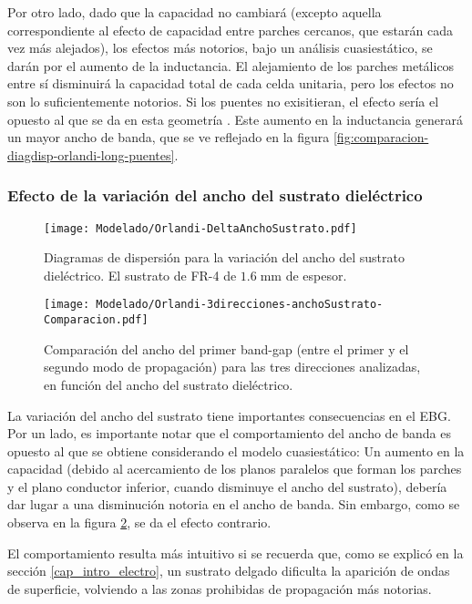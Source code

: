 Por otro lado, dado que la capacidad no cambiará (excepto aquella correspondiente al efecto de capacidad entre parches cercanos, que estarán cada vez más alejados), los efectos más notorios, bajo un análisis cuasiestático, se darán por el aumento de la inductancia. El alejamiento de los parches metálicos entre sí disminuirá la capacidad total de cada celda unitaria, pero los efectos no son lo suficientemente notorios. Si los puentes no exisitieran, el efecto sería el opuesto al que se da en esta geometría \cite{Yang:EBGAntennas}. Este aumento en la inductancia generará un mayor ancho de banda, que se ve reflejado en la figura \ref{fig:comparacion-diagdisp-orlandi-long-puentes}.

\subsubsection{Efecto de la variación del ancho del sustrato dieléctrico}

\begin{figure}[h]
	\centering
	\texttt{[image: Modelado/Orlandi-DeltaAnchoSustrato.pdf]}
	\caption{Diagramas de dispersión para la variación del ancho del sustrato dieléctrico. El sustrato de FR-4 de $1.6\;\text{mm}$ de espesor.}
	\label{fig:diagdisp-orlandi-variacion-ancho-diel}
\end{figure}


\begin{figure}[h]
	\centering
	\texttt{[image: Modelado/Orlandi-3direcciones-anchoSustrato-Comparacion.pdf]}
	\caption{Comparación del ancho del primer band-gap (entre el primer y el segundo modo de propagación) para las tres direcciones analizadas, en función del ancho del sustrato dieléctrico.}
	\label{fig:comparacion-diagdisp-orlandi-variacion-ancho-diel}
\end{figure}

La variación del ancho del sustrato tiene importantes consecuencias en el EBG. Por un lado, es importante notar que el comportamiento del ancho de banda es opuesto al que se obtiene considerando el modelo cuasiestático: Un aumento en la capacidad (debido al acercamiento de los planos paralelos que forman los parches y el plano conductor inferior, cuando disminuye el ancho del sustrato), debería dar lugar a una disminución notoria en el ancho de banda. Sin embargo, como se observa en la figura \ref{fig:comparacion-diagdisp-orlandi-variacion-ancho-diel}, se da el efecto contrario.

El comportamiento resulta más intuitivo si se recuerda que, como se explicó en la sección \ref{cap_intro_electro}, un sustrato delgado dificulta la aparición de ondas de superficie, volviendo a las zonas prohibidas de propagación más notorias.

